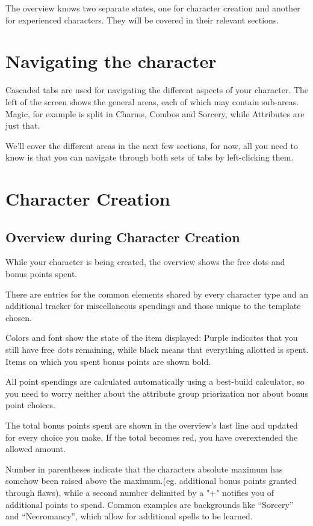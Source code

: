 The overview knows two separate states, one for character creation and another for experienced characters. They will be covered in their relevant sections.

\section{Navigating the character}
Cascaded tabs are used for navigating the different aspects of your character. The left of the screen shows the general areas, each of which may contain sub-areas. Magic, for example is split in Charms, Combos and Sorcery, while Attributes are just that.

We'll cover the different areas in the next few sections, for now, all you need to know is that you can navigate through both sets of tabs by left-clicking them.

\section{Character Creation}

\subsection{Overview during Character Creation}
While your character is being created, the overview shows the free dots and bonus points spent.

There are entries for the common elements shared by every character type and an additional tracker for miscellaneous spendings and those unique to the template chosen.

Colors and font show the state of the item displayed: Purple indicates that you still have free dots remaining, 
while black means that everything allotted is spent. Items on which you spent bonus points are shown bold. 

All point spendings are calculated automatically using a best-build calculator, so you need to worry neither about the attribute group priorization nor about bonus point choices.

The total bonus points spent are shown in the overview's last line and updated for every choice you make. If the total becomes red, you have overextended the allowed amount.

Number in parentheses indicate that the characters absolute maximum has somehow been raised above the maximum.(eg. additional bonus points granted through flaws), while a second number delimited by a "+" notifies you of additional points to spend. Common examples are backgrounds like "`Sorcery"' and "`Necromancy"', which allow for additional spells to be learned.

